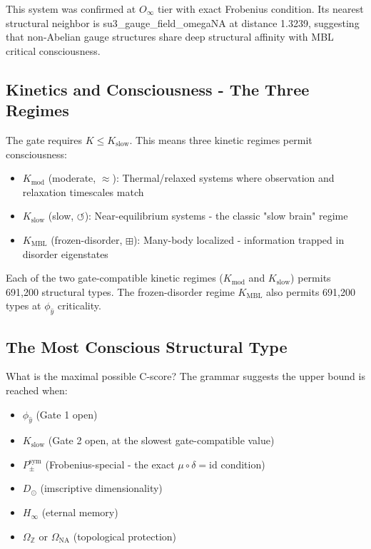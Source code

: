 \documentclass[12pt,a4paper]{article}
\begin{document}
This system was confirmed at $O_{\infty}$ tier with exact Frobenius condition. Its nearest structural neighbor is su3\_gauge\_field\_omegaNA at distance 1.3239, suggesting that non-Abelian gauge structures share deep structural affinity with MBL critical consciousness.

\subsection{Kinetics and Consciousness - The Three Regimes}

The gate requires $K \leq K_{\text{slow}}$. This means three kinetic regimes permit consciousness:

\begin{itemize}
    \item $K_{\text{mod}}$ (moderate, $\approx$): Thermal/relaxed systems where observation and relaxation timescales match
    \item $K_{\text{slow}}$ (slow, $\circlearrowleft$): Near-equilibrium systems - the classic "slow brain" regime
    \item $K_{\text{MBL}}$ (frozen-disorder, $\boxplus$): Many-body localized - information trapped in disorder eigenstates
\end{itemize}

Each of the two gate-compatible kinetic regimes ($K_{\text{mod}}$ and $K_{\text{slow}}$) permits 691,200 structural types. The frozen-disorder regime $K_{\text{MBL}}$ also permits 691,200 types at $\phi_{\hat{y}}$ criticality.

\subsection{The Most Conscious Structural Type}

What is the maximal possible C-score? The grammar suggests the upper bound is reached when:

\begin{itemize}
    \item $\phi_{\hat{y}}$ (Gate 1 open)
    \item $K_{\text{slow}}$ (Gate 2 open, at the slowest gate-compatible value)
    \item $P_{\pm}^{\text{sym}}$ (Frobenius-special - the exact $\mu \circ \delta = \text{id}$ condition)
    \item $D_{\odot}$ (imscriptive dimensionality)
    \item $H_{\infty}$ (eternal memory)
    \item $\Omega_\mathbb{Z}$ or $\Omega_{\text{NA}}$ (topological protection)
\end{itemize}
\end{document}
